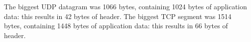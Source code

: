 The biggest UDP datagram was 1066 bytes, containing 1024 bytes of application data: this results in 42 bytes of header. The biggest TCP segment was 1514 bytes, containing 1448 bytes of application data: this results in 66 bytes of header.